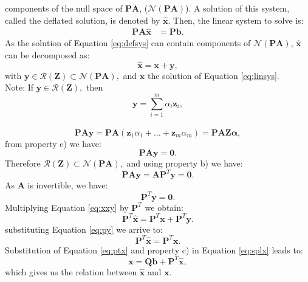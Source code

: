 \documentclass[review]{elsarticle}
\begin{document}
components of the null space of $\mathbf{P}\mathbf{A}$, ($\mathcal{N}(\mathbf{P}\mathbf{A})$). A solution of this system, called the deflated
solution, is denoted by $\mathbf{\hat{x}}$. Then, the linear system to solve is:\\
\begin{align}\label{eq:defsys}
\mathbf{P}\mathbf{A}\hat{\mathbf{x}}&=\mathbf{P}\mathbf{b}.
\end{align}
As the solution of Equation \eqref{eq:defsys} can contain components of 
$\mathcal{N}(\mathbf{P}\mathbf{A})$,
$\mathbf{\hat{x}}$ can be decomposed as:
\begin{equation}\label{eq:xxy}
\mathbf{\hat{x}}=\mathbf{x}+ \mathbf{y},
\end{equation}
with $\mathbf{y} \in \mathcal{R}(\mathbf{Z})\subset \mathcal{N}(\mathbf{P}\mathbf{A}),$ 
and $\mathbf{x}$ the solution of Equation \eqref{eq:linsys}.\\
Note: If $\mathbf{y} \in \mathcal{R}(\mathbf{Z}),$ then $$\mathbf{y}=\sum^{m}_{i=1}\alpha_i \mathbf{z}_i,$$\\
 \begin{equation*}\label{eq:paz}
 \mathbf{P}\mathbf{A}\mathbf{y} =\mathbf{P}\mathbf{A}(\mathbf{z}_1\alpha_1 +...+ \mathbf{z}_m\alpha_m)=\mathbf{P}\mathbf{A}\mathbf{Z}\mathbf{\alpha},\end{equation*}
 from property e) we have:
 \begin{equation*}\label{eq:pay}
 \mathbf{P}\mathbf{A}\mathbf{y}=\mathbf{0}.
 \end{equation*}
Therefore $\mathcal{R}(\mathbf{Z})\subset \mathcal{N}(\mathbf{P}\mathbf{A}),$ and using property b) we have:
 \begin{equation*}
 \mathbf{P}\mathbf{A}\mathbf{y}=\mathbf{A}\mathbf{P}^T\mathbf{y}=\mathbf{0}.
 \end{equation*}
 As $\mathbf{A}$ is invertible, we have:
  \begin{equation}\label{eq:py}
\mathbf{P}^T\mathbf{y}=\mathbf{0}.
 \end{equation}
 Multiplying Equation \eqref{eq:xxy} by $\mathbf{P}^T$ we obtain:
$$\mathbf{P}^T\mathbf{\hat{x}}=\mathbf{P}^T\mathbf{x}+\mathbf{P}^T\mathbf{y}.$$
substituting Equation \eqref{eq:py} we arrive to:
  \begin{equation}\label{eq:ptx}
\mathbf{P}^T\mathbf{\hat{x}}=\mathbf{P}^T\mathbf{x}.
 \end{equation}
Substitution of Equation \eqref{eq:ptx} and property c) in Equation \eqref{eq:splx} leads to:
\begin{equation}\label{eq:xfromxh1}
    \mathbf{x}=\mathbf{Q}\mathbf{b}+\mathbf{P}^T\mathbf{\hat{x}}, 
\end{equation}
which gives us the relation between $\mathbf{\hat{x}}$ and $\mathbf{x}$.
\end{document}
